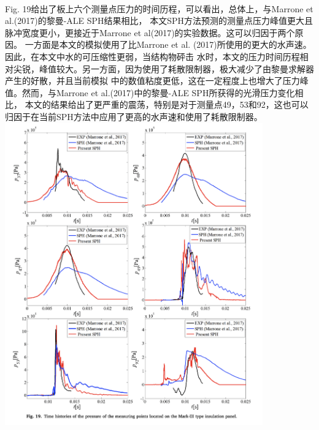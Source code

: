 \documentclass[UTF8]{ctexart}
\begin{document}
\paragraph{\quad}Fig. 19给出了板上六个测量点压力的时间历程，可以看出，总体上，与Marrone et al.(2017)的黎曼-ALE SPH结果相比，
                本文SPH方法预测的测量点压力峰值更大且脉冲宽度更小，更接近于Marrone et al(2017)的实验数据。这可以归因于两个原因。
                一方面是本文的模拟使用了比Marrone et al. (2017)所使用的更大的水声速。因此，在本文中水的可压缩性更弱，当结构物砰击
                水时，本文的压力时间历程相对尖锐，峰值较大。另一方面，因为使用了耗散限制器，极大减少了由黎曼求解器产生的好散，并且当前模拟
                中的数值粘度更低，这在一定程度上也增大了压力峰值。然而，与Marrone et al.(2017)中的黎曼-ALE SPH所获得的光滑压力变化相比，
                本文的结果给出了更严重的震荡，特别是对于测量点49，53和92，这也可以归因于在当前SPH方法中应用了更高的水声速和使用了耗散限制器。
{
    \centering
    \includegraphics[width=30em]{./source/Fig19.png}
}
\end{document}
